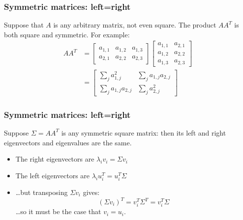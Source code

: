 \documentclass{beamer}
\begin{document}

\begin{frame}
  \frametitle{Symmetric matrices: left=right}

  Suppose that $A$ is any arbitrary matrix, not even square.  The
  product $AA^T$ is both square and symmetric.  For example:
  \begin{align*}
    AA^T &= \left[\begin{array}{ccc}a_{1,1}&a_{1,2}&a_{1,3}\\a_{2,1}&a_{2,2}&a_{2,3}\end{array}\right]
    \left[\begin{array}{cc}a_{1,1}&a_{2,1}\\a_{1,2}&a_{2,2}\\a_{1,3}&a_{2,3}\end{array}\right]\\
    &=
    \left[\begin{array}{cc}\sum_ja_{1,j}^2&\sum_ja_{1,j}a_{2,j}\\\sum_ja_{1,j}a_{2,j}&\sum_ja_{2,j}^2
      \end{array}\right]
  \end{align*}
\end{frame}

\begin{frame}
  \frametitle{Symmetric matrices: left=right}

  Suppose $\Sigma=AA^T$ is any symmetric square matrix: then its left
  and right eigenvectors and eigenvalues are the same.
  \begin{itemize}
  \item The right eigenvectors are $\lambda_iv_i=\Sigma v_i$
  \item The left eigenvectors are $\lambda_i u_i^T = u_i^T \Sigma$
  \item \ldots but transposing $\Sigma v_i$ gives:
    \[
    (\Sigma v_i)^T = v_i^T\Sigma^T = v_i^T\Sigma
    \]
    \ldots so it must be the case that $v_i=u_i$.
  \end{itemize}
\end{frame}
\end{document}
